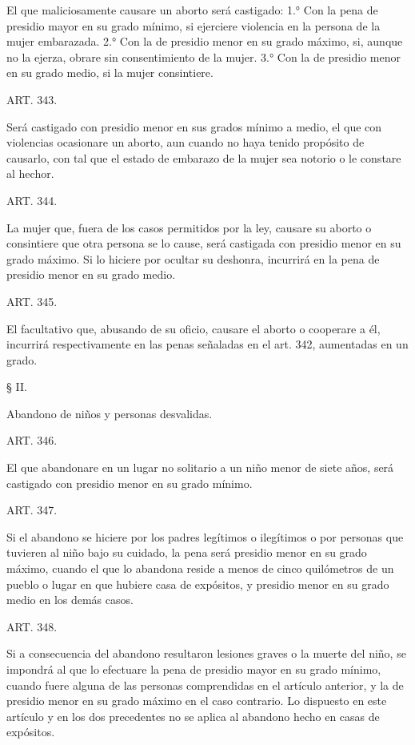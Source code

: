     El que maliciosamente causare un aborto será castigado:
    1.° Con la pena de presidio mayor en su grado mínimo, si ejerciere violencia en la persona de la mujer embarazada.
    2.° Con la de presidio menor en su grado máximo, si, aunque no la ejerza, obrare sin consentimiento de la mujer.
    3.° Con la de presidio menor en su grado medio, si la mujer consintiere.


    ART. 343.

    Será castigado con presidio menor en sus grados mínimo a medio, el que con violencias ocasionare un aborto, aun cuando no haya tenido propósito de causarlo, con tal que el estado de embarazo de la mujer sea notorio o le constare al hechor.


    ART. 344.

    La mujer que, fuera de los casos permitidos por la ley, causare su aborto o consintiere que otra persona se lo cause, será castigada con presidio menor en su grado máximo.
    Si lo hiciere por ocultar su deshonra, incurrirá en la pena de presidio menor en su grado medio.


    ART. 345.

    El facultativo que, abusando de su oficio, causare el aborto o cooperare a él, incurrirá respectivamente en las penas señaladas en el art. 342, aumentadas en un grado.


    § II.

    Abandono de niños y personas desvalidas.





    ART. 346.

    El que abandonare en un lugar no solitario a un niño menor de siete años, será castigado con presidio menor en su grado mínimo.


    ART. 347.

    Si el abandono se hiciere por los padres legítimos o ilegítimos o por personas que tuvieren al niño bajo su cuidado, la pena será presidio menor en su grado máximo, cuando el que lo abandona reside a menos de cinco quilómetros de un pueblo o lugar en que hubiere casa de expósitos, y presidio menor en su grado medio en los demás casos.


    ART. 348.

    Si a consecuencia del abandono resultaron lesiones graves o la muerte del niño, se impondrá al que lo efectuare la pena de presidio mayor en su grado mínimo, cuando fuere alguna de las personas comprendidas en el artículo anterior, y la de presidio menor en su grado máximo en el caso contrario.
    Lo dispuesto en este artículo y en los dos precedentes no se aplica al abandono hecho en casas de expósitos.



